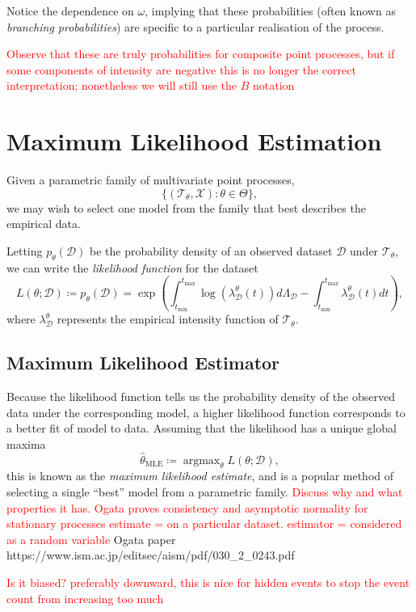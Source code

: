 \documentclass[honours,12pt]{unswthesis}
\DeclareMathOperator*{\argmax}{argmax}
\numberwithin{equation}{section}
\begin{document}
Notice the dependence on $\omega$, implying that these probabilities (often known as \textit{branching probabilities}) are specific to a particular realisation of the process.

\textcolor{red}{Observe that these are truly probabilities for composite point processes, but if some components of intensity are negative this is no longer the correct interpretation; nonetheless we will still use the $B$ notation}
\section{Maximum Likelihood Estimation}
Given a parametric family of multivariate point processes,
$$\{(\mathcal{T}_\theta,\mathcal{X}) : \theta\in\Theta\},$$
we may wish to select one model from the family that best describes the empirical data.

Letting $p_\theta(\mathcal{D})$ be the probability density of an observed dataset $\mathcal{D}$ under $\mathcal{T}_\theta$, we can write the \textit{likelihood function} for the dataset
$$L(\theta ; \mathcal{D}) \coloneq p_\theta(\mathcal{D}) = \exp\left(\int_{t_\mathrm{min}}^{t_\mathrm{max}}\log(\lambda_\mathcal{D}^\theta(t))d\Lambda_\mathcal{D}-\int_{t_\mathrm{min}}^{t_\mathrm{max}}\lambda_\mathcal{D}^\theta(t) dt\right),$$
where $\lambda_\mathcal{D}^\theta$ represents the empirical intensity function of $\mathcal{T}_\theta$.

\subsection{Maximum Likelihood Estimator}
Because the likelihood function tells us the probability density of the observed data under the corresponding model, a higher likelihood function corresponds to a better fit of model to data. Assuming that the likelihood has a unique global maxima
$$\hat\theta_\mathrm{MLE} \coloneq \argmax_\theta L(\theta;\mathcal{D}),$$
this is known as the \textit{maximum likelihood estimate}, and is a popular method of selecting a single ``best'' model from a parametric family.
\textcolor{red}{Discuss why and what properties it has. Ogata proves consistency and asymptotic normality for stationary processes}
\textcolor{red}{estimate = on a particular dataset. estimator = considered as a random variable}
Ogata paper https://www.ism.ac.jp/editsec/aism/pdf/030_2_0243.pdf 

\textcolor{red}{Is it biased? preferably downward, this is nice for hidden events to stop the event count from increasing too much}
\end{document}
